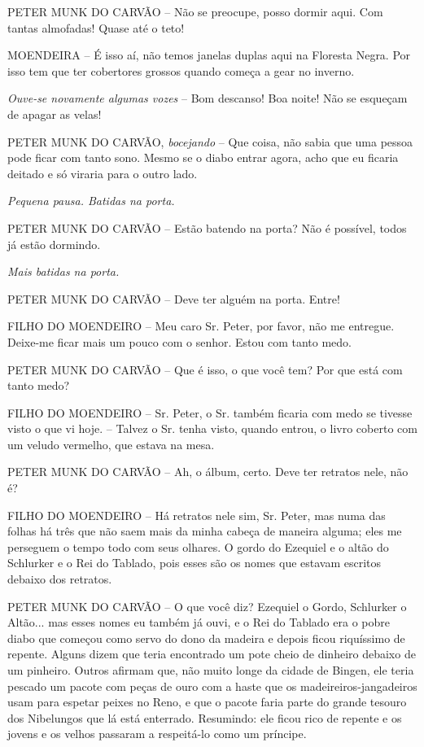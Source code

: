 PETER MUNK DO CARVÃO -- Não se preocupe, posso dormir aqui. Com tantas
almofadas! Quase até o teto!

MOENDEIRA -- É isso aí, não temos janelas duplas aqui na Floresta Negra.
Por isso tem que ter cobertores grossos quando começa a gear no inverno.

\emph{Ouve-se novamente algumas vozes} -- Bom descanso! Boa noite! Não
se esqueçam de apagar as velas!

PETER MUNK DO CARVÃO, \emph{bocejando} -- Que coisa, não sabia que uma
pessoa pode ficar com tanto sono. Mesmo se o diabo entrar agora, acho
que eu ficaria deitado e só viraria para o outro lado.

\emph{Pequena pausa. Batidas na porta.}

PETER MUNK DO CARVÃO -- Estão batendo na porta? Não é possível, todos já
estão dormindo.

\emph{Mais batidas na porta.}

PETER MUNK DO CARVÃO -- Deve ter alguém na porta. Entre!

FILHO DO MOENDEIRO -- Meu caro Sr. Peter, por favor, não me entregue.
Deixe-me ficar mais um pouco com o senhor. Estou com tanto medo.

PETER MUNK DO CARVÃO -- Que é isso, o que você tem? Por que está com
tanto medo?

FILHO DO MOENDEIRO -- Sr. Peter, o Sr. também ficaria com medo se
tivesse visto o que vi hoje. -- Talvez o Sr. tenha visto, quando entrou,
o livro coberto com um veludo vermelho, que estava na mesa.

PETER MUNK DO CARVÃO -- Ah, o álbum, certo. Deve ter retratos nele, não
é?

FILHO DO MOENDEIRO -- Há retratos nele sim, Sr. Peter, mas numa das
folhas há três que não saem mais da minha cabeça de maneira alguma; eles
me perseguem o tempo todo com seus olhares. O gordo do Ezequiel e o
altão do Schlurker e o Rei do Tablado, pois esses são os nomes que
estavam escritos debaixo dos retratos.

PETER MUNK DO CARVÃO -- O que você diz? Ezequiel o Gordo, Schlurker o
Altão... mas esses nomes eu também já ouvi, e o Rei do Tablado era o
pobre diabo que começou como servo do dono da madeira e depois ficou
riquíssimo de repente. Alguns dizem que teria encontrado um pote cheio
de dinheiro debaixo de um pinheiro. Outros afirmam que, não muito longe
da cidade de Bingen, ele teria pescado um pacote com peças de ouro com a
haste que os madeireiros-jangadeiros usam para espetar peixes no Reno, e
que o pacote faria parte do grande tesouro dos Nibelungos que lá está
enterrado. Resumindo: ele ficou rico de repente e os jovens e os velhos
passaram a respeitá-lo como um príncipe.

